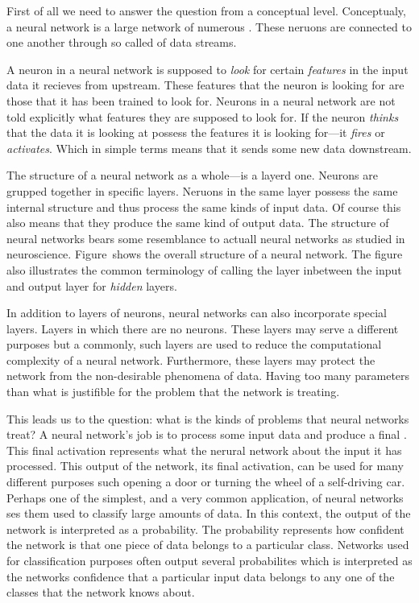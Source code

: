 \startsection[title=Machine learning concepts]
First of all we need to answer the question  from a conceptual level.
Conceptualy, a neural network is a large network of numerous .
These neruons are connected to one another through so called  of data streams.

A neuron in a neural network is supposed to {\em look} for certain {\em features} in the input data it recieves from upstream.
These features that the neuron is looking for are those that it has been trained to look for.
Neurons in a neural network are not told explicitly what features they are supposed to look for.
If the neuron {\em thinks} that the data it is looking at possess the features it is looking for---it {\em fires} or {\em activates}.
Which in simple terms means that it sends some new data downstream.

The structure of a neural network as a whole---is a layerd one.
Neurons are grupped together in specific layers.
Neruons in the same layer possess the same internal structure and thus process the same kinds of input data.
Of course this also means that they produce the same kind of output data.
The structure of neural networks bears some resemblance to actuall neural networks as studied in neuroscience.
Figure~ shows the overall structure of a neural network.
The figure also illustrates the common terminology of calling the layer inbetween the input and output layer for {\em hidden} layers.

\startplacefigure[
    reference=network-general-structure,
    location=bottom,
    title={Overview of a neural network structure~\cite[noah_2018]},
]
\stopplacefigure

In addition to layers of neurons, neural networks can also incorporate special  layers.
Layers in which there are no neurons.
These layers may serve a different purposes but a commonly, such layers are used to reduce the computational complexity of a neural network.
Furthermore, these layers may protect the network from the non-desirable phenomena of  data.
Having too many parameters than what is justifible for the problem that the network is treating.

This leads us to the question: what is the kinds of problems that neural networks treat?
A neural network's job is to process some input data and produce a final .
This final activation represents what the nerural network  about the input it has processed.
This output of the network, its final activation, can be used for many different purposes such opening a door or turning the wheel of a self-driving car.
Perhaps one of the simplest, and a very common application, of neural networks ses them used to classify large amounts of data.
In this context, the output of the network is interpreted as a probability.
The probability represents how confident the network is that one piece of data belongs to a particular class.
Networks used for classification purposes often output several probabilites which is interpreted as the networks confidence that a particular input data belongs to any one of the classes that the network knows about.

